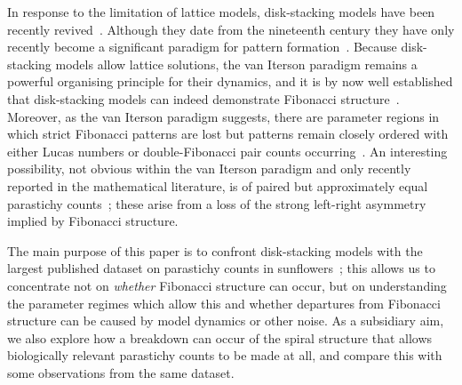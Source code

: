 \documentclass[a4paper,10pt]{amsart}
\begin{document}
In response to the limitation of lattice models, disk-stacking models have been recently revived~\cite{atelaDynamicalSystemPlant2002}. Although they date from the nineteenth century they have only recently become a significant paradigm for pattern formation~\cite{godinPhyllotaxisGeometricCanalization2020,goleFibonacciQuasisymmetricPhyllotaxis2016}. Because disk-stacking models allow lattice solutions,  the van Iterson paradigm remains a powerful organising principle for their dynamics, and it is by now well established that disk-stacking models can indeed demonstrate Fibonacci structure~\cite{goleFibonacciQuasisymmetricPhyllotaxis2016}. Moreover, as the van Iterson paradigm suggests, there are parameter regions in which strict Fibonacci patterns are lost but patterns remain closely ordered with either Lucas numbers or double-Fibonacci pair counts occurring~\cite{goleFibonacciQuasisymmetricPhyllotaxis2016,yonekuraMathematicalModelStudies2019}. An interesting possibility, not obvious within the van Iterson paradigm and only recently reported in the mathematical literature, is of paired but approximately equal parastichy counts~\cite{goleFibonacciQuasisymmetricPhyllotaxis2016}; these arise from a loss of the strong left-right asymmetry implied by Fibonacci structure. 

The main purpose of this paper is to confront disk-stacking models with the largest published dataset on parastichy counts in sunflowers~\cite{swintonNovelFibonacciNonFibonacci2016}; this allows us to  concentrate not on \textit{whether} Fibonacci structure can occur, but on understanding the parameter regimes which allow this and whether departures from Fibonacci structure can be caused by model dynamics or other noise. 
As a subsidiary aim, we also explore how a breakdown can occur of the spiral structure that allows biologically relevant parastichy counts to be made at all, and compare this with some observations from the same dataset. 
\end{document}
